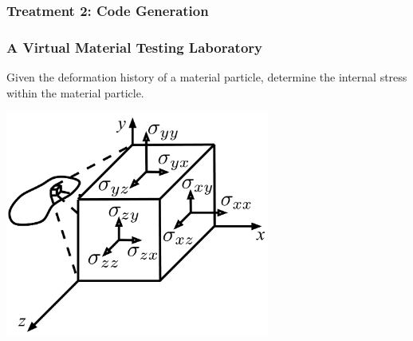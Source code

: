 \documentclass[usenames,dvipsnames]{beamer}
\begin{document}
\begin{frame}

  \frametitle{Treatment 2: Code Generation}
  
  \hspace{2cm}


  
\end{frame}
  
  
\begin{frame}
  
  \frametitle{A Virtual Material Testing Laboratory}
  
  Given the deformation history of a material particle, determine the internal
  stress within the material particle.
  
  \begin{center}
  {
  \includegraphics[width=0.65\textwidth]{StressTensor.pdf}
  }
  \end{center}
  
  \end{frame}
  
  
\end{document}
